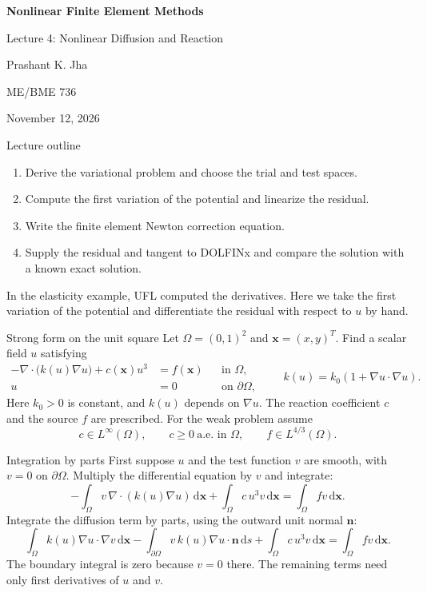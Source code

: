 \documentclass[11pt,aspectratio=169]{beamer}
\newcommand{\bx}{\bm x}
\newcommand{\dd}{\mathrm d}
\begin{document}
\begin{frame}
\centering\vfill
{\LARGE\bfseries Nonlinear Finite Element Methods\par}
\vspace{0.45cm}
{\Large Lecture 4: Nonlinear Diffusion and Reaction\par}
\vspace{0.45cm}
Prashant K. Jha\par
ME/BME 736\par
November 12, 2026
\vfill
\end{frame}

\begin{frame}{Lecture outline}
\begin{enumerate}
\item Derive the variational problem and choose the trial and test spaces.
\item Compute the first variation of the potential and linearize the residual.
\item Write the finite element Newton correction equation.
\item Supply the residual and tangent to DOLFINx and compare the solution with a known exact solution.
\end{enumerate}
In the elasticity example, UFL computed the derivatives. Here we take the
first variation of the potential and differentiate the residual with respect
to $u$ by hand.
\end{frame}

\begin{frame}{Strong form on the unit square}
Let $\Omega=(0,1)^2$ and $\bx=(x,y)^T$. Find a scalar field $u$ satisfying
\[
\boxed{
\begin{aligned}
-\nabla\cdot\bigl(k(u)\nabla u\bigr)+c(\bx)u^3
  &=f(\bx) && \text{in }\Omega,\\
u &=0 && \text{on }\partial\Omega,
\end{aligned}}
\qquad
k(u)=k_0(1+\nabla u\cdot\nabla u).
\]
Here $k_0>0$ is constant, and $k(u)$ depends on $\nabla u$.
The reaction coefficient $c$ and the source $f$ are prescribed.
For the weak problem assume
\[
c\in L^\infty(\Omega),\qquad c\ge 0\ \text{a.e. in }\Omega,\qquad
f\in L^{4/3}(\Omega).
\]
\end{frame}

\begin{frame}{Integration by parts}
First suppose $u$ and the test function $v$ are smooth, with
$v=0$ on $\partial\Omega$. Multiply the differential equation by $v$
and integrate:
\[
-\int_\Omega v\,\nabla\cdot(k(u)\nabla u)\,\dd\bx
+\int_\Omega c\,u^3v\,\dd\bx
=\int_\Omega fv\,\dd\bx .
\]
Integrate the diffusion term by parts, using the outward unit normal $\bm n$:
\[
\int_\Omega k(u)\nabla u\cdot\nabla v\,\dd\bx
-\int_{\partial\Omega} v\,k(u)\nabla u\cdot\bm n\,\dd s
+\int_\Omega c\,u^3v\,\dd\bx
=\int_\Omega fv\,\dd\bx .
\]
The boundary integral is zero because $v=0$ there.
The remaining terms need only first derivatives of $u$ and $v$.
\end{frame}
\end{document}

